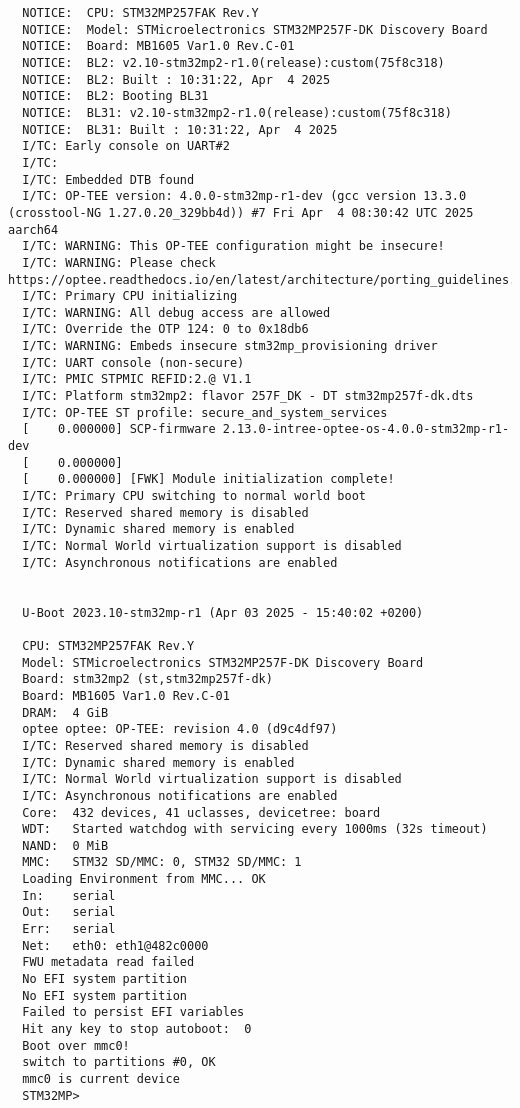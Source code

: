 \begin{verbatim}
  NOTICE:  CPU: STM32MP257FAK Rev.Y
  NOTICE:  Model: STMicroelectronics STM32MP257F-DK Discovery Board
  NOTICE:  Board: MB1605 Var1.0 Rev.C-01
  NOTICE:  BL2: v2.10-stm32mp2-r1.0(release):custom(75f8c318)
  NOTICE:  BL2: Built : 10:31:22, Apr  4 2025
  NOTICE:  BL2: Booting BL31
  NOTICE:  BL31: v2.10-stm32mp2-r1.0(release):custom(75f8c318)
  NOTICE:  BL31: Built : 10:31:22, Apr  4 2025
  I/TC: Early console on UART#2
  I/TC: 
  I/TC: Embedded DTB found
  I/TC: OP-TEE version: 4.0.0-stm32mp-r1-dev (gcc version 13.3.0 (crosstool-NG 1.27.0.20_329bb4d)) #7 Fri Apr  4 08:30:42 UTC 2025 aarch64
  I/TC: WARNING: This OP-TEE configuration might be insecure!
  I/TC: WARNING: Please check https://optee.readthedocs.io/en/latest/architecture/porting_guidelines.html
  I/TC: Primary CPU initializing
  I/TC: WARNING: All debug access are allowed
  I/TC: Override the OTP 124: 0 to 0x18db6
  I/TC: WARNING: Embeds insecure stm32mp_provisioning driver
  I/TC: UART console (non-secure)
  I/TC: PMIC STPMIC REFID:2.@ V1.1
  I/TC: Platform stm32mp2: flavor 257F_DK - DT stm32mp257f-dk.dts
  I/TC: OP-TEE ST profile: secure_and_system_services
  [    0.000000] SCP-firmware 2.13.0-intree-optee-os-4.0.0-stm32mp-r1-dev
  [    0.000000] 
  [    0.000000] [FWK] Module initialization complete!
  I/TC: Primary CPU switching to normal world boot
  I/TC: Reserved shared memory is disabled
  I/TC: Dynamic shared memory is enabled
  I/TC: Normal World virtualization support is disabled
  I/TC: Asynchronous notifications are enabled
  
  
  U-Boot 2023.10-stm32mp-r1 (Apr 03 2025 - 15:40:02 +0200)
  
  CPU: STM32MP257FAK Rev.Y
  Model: STMicroelectronics STM32MP257F-DK Discovery Board
  Board: stm32mp2 (st,stm32mp257f-dk)
  Board: MB1605 Var1.0 Rev.C-01
  DRAM:  4 GiB
  optee optee: OP-TEE: revision 4.0 (d9c4df97)
  I/TC: Reserved shared memory is disabled
  I/TC: Dynamic shared memory is enabled
  I/TC: Normal World virtualization support is disabled
  I/TC: Asynchronous notifications are enabled
  Core:  432 devices, 41 uclasses, devicetree: board
  WDT:   Started watchdog with servicing every 1000ms (32s timeout)
  NAND:  0 MiB
  MMC:   STM32 SD/MMC: 0, STM32 SD/MMC: 1
  Loading Environment from MMC... OK
  In:    serial
  Out:   serial
  Err:   serial
  Net:   eth0: eth1@482c0000
  FWU metadata read failed
  No EFI system partition
  No EFI system partition
  Failed to persist EFI variables
  Hit any key to stop autoboot:  0 
  Boot over mmc0!
  switch to partitions #0, OK
  mmc0 is current device
  STM32MP>  
\end{verbatim}

